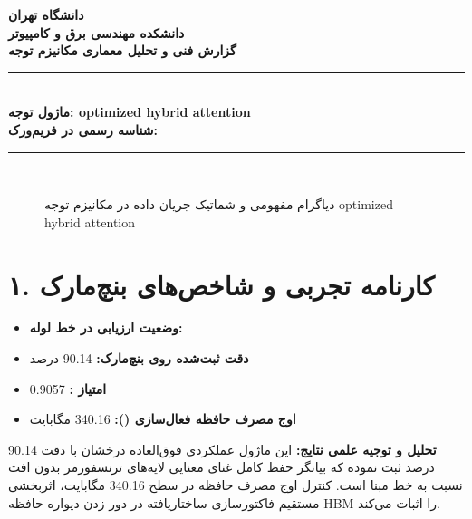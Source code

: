 \documentclass[12pt,a4paper]{article}
\begin{document}
\begin{center}
{\Large\bfseries دانشگاه تهران}\\[0.2cm]
{\large\bfseries دانشکده مهندسی برق و کامپیوتر}\\[0.2cm]
{\large\bfseries گزارش فنی و تحلیل معماری مکانیزم توجه}\\[0.5cm]
\rule{\linewidth}{1pt}\\[0.3cm]
{\LARGE\bfseries ماژول توجه: optimized hybrid attention}\\[0.2cm]
{\large \textbf{شناسه رسمی در فریم‌ورک:} }\\[0.2cm]
\rule{\linewidth}{1pt}\\[0.5cm]
\end{center}

\begin{figure}[H]
\centering
{}
\caption{دیاگرام مفهومی و شماتیک جریان داده در مکانیزم توجه optimized hybrid attention}
\end{figure}

\section*{۱. کارنامه تجربی و شاخص‌های بنچ‌مارک}
\begin{itemize}
\item \textbf{وضعیت ارزیابی در خط لوله:} 
\item \textbf{دقت ثبت‌شده روی بنچ‌مارک:} 90.14 درصد
\item \textbf{امتیاز :} 0.9057
\item \textbf{اوج مصرف حافظه فعال‌سازی ():} 340.16 مگابایت
\end{itemize}
\textbf{تحلیل و توجیه علمی نتایج:} این ماژول عملکردی فوق‌العاده درخشان با دقت 90.14 درصد ثبت نموده که بیانگر حفظ کامل غنای معنایی لایه‌های ترنسفورمر بدون افت نسبت به خط مبنا است. کنترل اوج مصرف حافظه در سطح 340.16 مگابایت، اثربخشی مستقیم فاکتورسازی ساختاریافته در دور زدن دیواره حافظه HBM را اثبات می‌کند.
\end{document}
